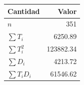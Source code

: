 \begin{tabular}{l r}
\toprule
Cantidad & Valor \\
\midrule
$n$ & \num{351} \\
$\sum T_i$ & \num{6250.89} \\
$\sum T_i^2$ & \num{123882.34} \\
$\sum D_i$ & \num{4213.72} \\
$\sum T_i D_i$ & \num{61546.62} \\
\bottomrule
\end{tabular}
